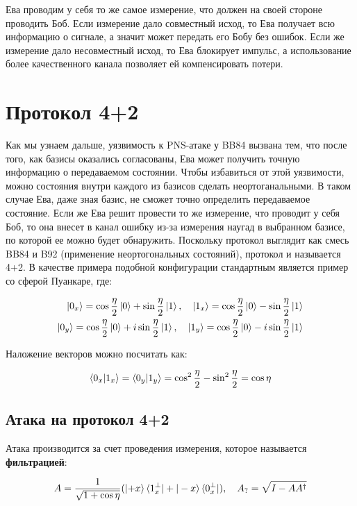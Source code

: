 \documentclass[a4paper, 12pt]{article}
\begin{document}
Ева проводим у себя то же самое измерение, что должен на своей стороне проводить Боб. Если измерение дало совместный исход, то Ева получает всю информацию о сигнале, а значит может передать его Бобу без ошибок. Если же измерение дало несовместный исход, то Ева блокирует импульс, а использование более качественного канала позволяет ей компенсировать потери.

\section{Протокол 4+2}

Как мы узнаем дальше, уязвимость к PNS-атаке у BB84 вызвана тем, что после того, как базисы оказались согласованы, Ева может получить точную информацию о передаваемом состоянии. Чтобы избавиться от этой уязвимости, можно состояния внутри каждого из базисов сделать неортоганальными. В таком случае Ева, даже зная базис, не сможет точно определить передаваемое состояние. Если же Ева решит провести то же измерение, что проводит у себя Боб, то она внесет в канал ошибку из-за измерения наугад в выбранном базисе, по которой ее можно будет обнаружить. Поскольку протокол выглядит как смесь BB84 и B92 (применение неортогональных состояний), протокол и называется 4+2. В качестве примера подобной конфигурации стандартным является пример со сферой Пуанкаре, где:

\begin{align}
	\ket{0_x} = \cos\frac{\eta}{2}\ket{0} + \sin\frac{\eta}{2} \ket{1}, \quad \ket{1_x} = \cos\frac{\eta}{2} \ket{0} - \sin\frac{\eta}{2}\ket{1}\\
	\ket{0_y} = \cos\frac{\eta}{2}\ket{0} + i\sin\frac{\eta}{2} \ket{1}, \quad \ket{1_y} = \cos\frac{\eta}{2} \ket{0} - i\sin\frac{\eta}{2}\ket{1}
\end{align}

Наложение векторов можно посчитать как:

\begin{equation}
	\braket{0_x|1_x} = \braket{0_y|1_y} = \cos^2 \frac{\eta}{2} - \sin^2\frac{\eta}{2} = \cos\eta
\end{equation}

\subsection{Атака на протокол 4+2}

Атака производится за счет проведения измерения, которое называется \textbf{фильтрацией}:

\begin{equation}
	A = \frac{1}{\sqrt{1 + \cos\eta}}(\ket{+x}\braket{1_x^\perp|+|-x}\bra{0_x^\perp}), \quad A_? = \sqrt{I - A A^\dagger}
\end{equation}
\end{document}
